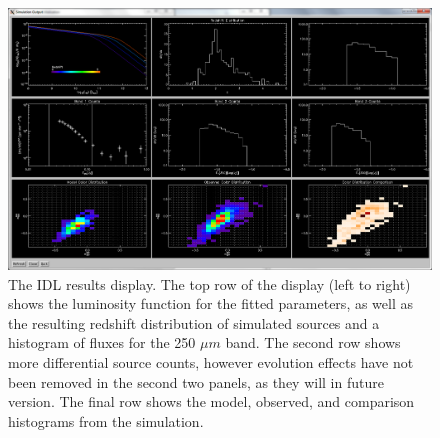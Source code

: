 \documentclass[twocolumn,letterpaper,10pt]{article}
\begin{document}
\begin{onecolumn}
\begin{figure}
  \includegraphics[width=\textwidth]{bestfit2.png}
  \caption{The IDL results display. The top row of the display (left to right) shows the luminosity function for the fitted parameters, as well as the resulting redshift distribution of simulated sources and a histogram of fluxes for the 250 $\mu m$ band. The second row shows more differential source counts, however evolution effects have not been removed in the second two panels, as they will in future version. The final row shows the model, observed, and comparison histograms from the simulation.}
  \label{disp:res}
\end{figure}
\end{onecolumn}
\end{document}
